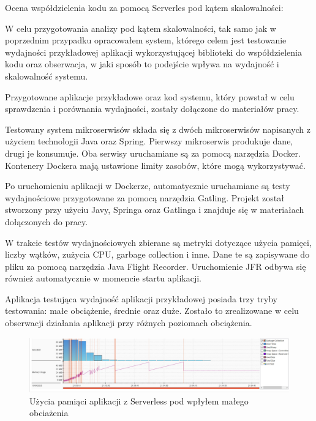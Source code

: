 \documentclass[runningheads,12pt]{llncs}
\begin{document}
\newpage



Ocena współdzielenia kodu za pomocą Serverles pod kątem skalowalności:

W celu przygotowania analizy pod kątem skalowalności, tak samo jak w poprzednim przypadku opracowałem system, którego celem jest testowanie wydajności przykładowej aplikacji wykorzystującej biblioteki do współdzielenia kodu oraz obserwacja, w jaki sposób to podejście wpływa na wydajność i skalowalność systemu.

Przygotowane aplikacje przykładowe oraz kod systemu, który powstał w celu sprawdzenia i porównania wydajności, zostały dołączone do materiałów pracy.

Testowany system mikroserwisów składa się z dwóch mikroserwisów napisanych z użyciem technologii Java oraz Spring. Pierwszy mikroserwis produkuje dane, drugi je konsumuje. Oba serwisy uruchamiane są za pomocą narzędzia Docker. Kontenery Dockera mają ustawione limity zasobów, które mogą wykorzystywać.

Po uruchomieniu aplikacji w Dockerze, automatycznie uruchamiane są testy wydajnościowe przygotowane za pomocą narzędzia Gatling. Projekt został stworzony przy użyciu Javy, Springa oraz Gatlinga i znajduje się w materiałach dołączonych do pracy.

W trakcie testów wydajnościowych zbierane są metryki dotyczące użycia pamięci, liczby wątków, zużycia CPU, garbage collection i inne. Dane te są zapisywane do pliku za pomocą narzędzia Java Flight Recorder. Uruchomienie JFR odbywa się również automatycznie w momencie startu aplikacji.

Aplikacja testująca wydajność aplikacji przykładowej posiada trzy tryby testowania: małe obciążenie, średnie oraz duże. Zostało to zrealizowane w celu obserwacji działania aplikacji przy różnych poziomach obciążenia.


\begin{figure}
    \includegraphics[width=\linewidth]{images/serverless-memory-low-graph.jpg}
    \caption{Użycia pamiąci aplikacji z Serverless pod wpłyłem małego obciażenia} \label{fig1}
\end{figure}
\end{document}
